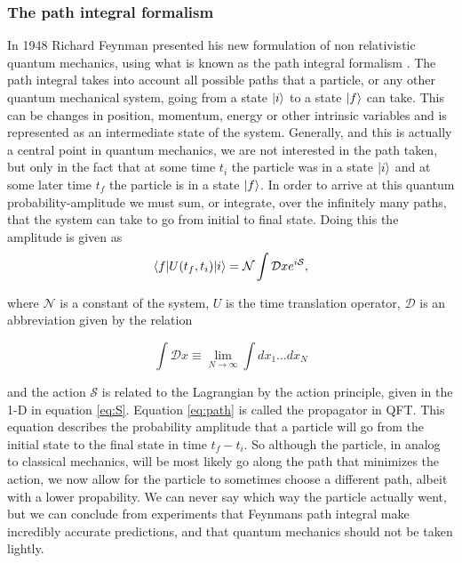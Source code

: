 \subsubsection{The path integral formalism} \label{sec:feynpath}
In 1948 Richard Feynman presented his new formulation of non relativistic quantum mechanics, using what is known as the path integral formalism \cite{feynman1948sta}. The path integral takes into account all possible paths that a particle, or any other quantum mechanical system, going from a state $|i \rangle$ to a state $|f \rangle$ can take. This can be changes in position, momentum, energy or other intrinsic variables and is represented as an intermediate state of the system. Generally, and this is actually a central point in quantum mechanics, we are not interested in the path taken, but only in the fact that at some time $t_{i}$ the particle was in a state $|i \rangle$ and at some later time $t_{f}$ the particle is in a state $|f \rangle$. In order to arrive at this quantum probability-amplitude we must sum, or integrate, over the infinitely many paths, that the system can take to go from initial to final state. Doing this the amplitude is given as  
\begin{equation} \label{eq:path}
	\langle f| U(t_f,t_i) |i \rangle = \mathcal{N} \int \mathcal{D}x e^{i\mathcal{S}},
\end{equation}

where $\mathcal{N}$ is a constant of the system, $U$ is the time translation operator, $\mathcal{D}$ is an abbreviation given by the relation 

\begin{equation}
	\int \mathcal{D} x \equiv \lim_{N \to \infty} \int dx_1 \dots dx_N
\end{equation}

and the action $\mathcal{S}$ is related to the Lagrangian by the action principle, given in the 1-D in equation \ref{eq:S}. Equation \eqref{eq:path} is called the propagator in QFT. This equation describes the probability amplitude that a particle will go from the initial state to the final state in time $t_f - t_i$. So although the particle, in analog to classical mechanics, will be most likely go along the path that minimizes the action, we now allow for the particle to sometimes choose a different path, albeit with a lower propability. We can never say which way the particle actually went, but we can conclude from experiments that Feynmans path integral make incredibly accurate predictions, and that quantum mechanics should not be taken lightly. 

